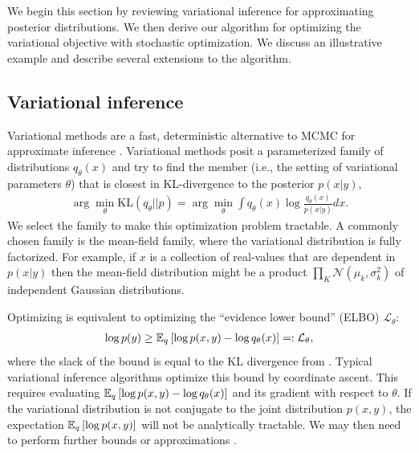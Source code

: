 We begin this section by reviewing variational inference for
approximating posterior distributions.  We then derive our algorithm
for optimizing the variational objective with stochastic optimization.
We discuss an illustrative example and describe several extensions to
the algorithm.

\subsection{Variational inference}

Variational methods are a fast, deterministic alternative to MCMC for
approximate inference \cite{jordan:2003,jordan:1999}. Variational
methods posit a parameterized family of distributions $q_{\theta}(x)$
and try to find the member (i.e., the setting of variational
parameters $\theta$) that is closest in KL-divergence to the posterior
$p(x | y)$,
\begin{align}
  \arg \min_{\theta} \mbox{KL}(q_\theta || p) = \arg \min_{\theta}
  \int q_\theta(x) \log \frac{q_\theta(x)}{p(x | y)} dx.
  \label{equation:stochastic_variational_objective}
\end{align}
We select the family to make this optimization problem tractable.  A
commonly chosen family is the mean-field family, where the variational
distribution is fully factorized.  For example, if $x$ is a collection
of real-values that are dependent in $p(x | y)$ then the mean-field
distribution might be a product $\prod_K \mathcal{N}(\mu_k,
\sigma_k^2)$ of independent Gaussian distributions.




Optimizing  is equivalent to optimizing
the ``evidence lower bound'' (ELBO) $\mathcal{L}_\theta$:
\begin{eqnarray}
  \log p(y) \ge \mathbb{E}_q\left[\log p(x, y) - \log q_\theta(x)\right]
  =: \mathcal{L}_\theta,
  \label{equation:stochastic_traditional_variational_objective}
\end{eqnarray}
where the slack of the bound is equal to the KL divergence from
.  Typical variational inference
algorithms optimize this bound by coordinate ascent.  This requires
evaluating $\mathbb{E}_q\left[ \log p(x, y) - \log q_\theta(x)\right]$ and its
gradient with respect to $\theta$. If the variational distribution is
not conjugate to the joint distribution $p(x, y)$, the expectation
$\mathbb{E}_q\left[ \log p(x, y)\right]$ will not be analytically tractable. We may
then need to perform further bounds or approximations
\cite{jaakkola:2000,jordan:1999,bickel:2007,braun:2007}.


